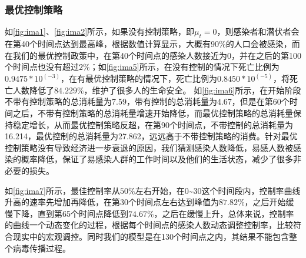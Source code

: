 \subsubsection{最优控制策略}
如\autoref{fig:ima1}、\autoref{fig:ima2}所示，如果没有控制策略，即$\mu_t=0$，则感染者和潜伏者会在第40个时间点达到最高峰，根据数值计算显示，大概有$90\%$的人口会被感染，而在我们的最优控制政策中，在第40个时间点的感染人数接近为0，并在之后的第100个时间点也没有超过$2\%$；如\autoref{fig:ima5}所示，在没有控制的情况下死亡比例为$0.9475*10^(-3)$，在有最优控制策略的情况下，死亡比例为$0.8450*10^(-5)$，将死亡人数降低了$84.229\%$，维护了很多人的生命安全。
如\autoref{fig:ima6}所示，在开始阶段不带有控制策略的总消耗量为7.59，带有控制的总消耗量为4.67，但是在第60个时间之后，不带有控制策略的总消耗量增速开始降低，而最优控制策略的总消耗量保持稳定增长，从而最优控制策略反超，在第90个时间点，不带控制的总消耗量为16.214，最优控制的总消耗量为27.862，远远高于不带控制策略的消费。针对最优控制策略没有导致经济进一步衰退的原因，我们猜测感染人数降低，易感人数被感染的概率降低，保证了易感染人群的工作时间以及他们的生活状态，减少了很多非必要的损失。

如\autoref{fig:ima7}所示，最佳控制率从$50\%$左右开始，在0\~{}30这个时间段内，控制率曲线升高的速率先增加再降低，在第30个时间点左右达到峰值为$87.82\%$，之后开始缓慢下降，直到第65个时间点降低到$74.67\%$，之后在缓慢上升，总体来说，控制率的曲线一个动态变化的过程，根据每个时间点的感染人数动态调整控制率，比较符合现实中的宏观调控。同时我们的模型是在130个时间点之内，其结果不能包含整个病毒传播过程。

